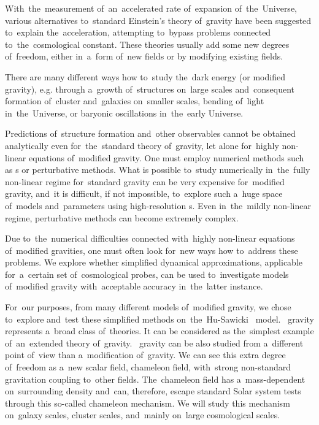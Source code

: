 With~the~measurement of~an~accelerated rate of~expansion of~the~Universe, various alternatives to~standard Einstein's theory of~gravity have been suggested to~explain the~acceleration, attempting to~bypass problems connected to~the~cosmological constant. These theories usually add some new degrees of~freedom, either in~a~form of~new fields or by modifying existing fields.

There are many different ways how to~study the~dark energy (or modified gravity), e.g. through a~growth of~structures on~large scales and~consequent formation of~cluster and~galaxies on~smaller scales, bending of~light in~the~Universe, or baryonic oscillations in~the~early Universe.

Predictions of~structure formation and~other observables cannot be obtained analytically even for~the~standard theory of~gravity, let alone for~highly non-linear equations of~modified gravity. One must employ numerical methods such as \nbodysim s or perturbative methods. What is possible to~study numerically in~the~fully non-linear regime for~standard gravity can be very expensive for~modified gravity, and~it is difficult, if not impossible, to~explore such a~huge space of~models and~parameters using high-resolution \nbodysim s. Even in~the~mildly non-linear regime, perturbative methods can become extremely complex.

Due to~the~numerical difficulties connected with~highly non-linear equations of~modified gravities, one must often look for~new ways how to~address these problems. We explore whether simplified dynamical approximations, applicable for~a~certain set of~cosmological probes, can be used to~investigate models of~modified gravity with~acceptable accuracy in~the~latter instance.

For~our purposes, from many different models of~modified gravity, we chose to~explore and~test these simplified methods on~the~Hu-Sawicki \fR\ model. \fR\ gravity represents a~broad class of~theories. It can be considered as the~simplest example of~an~extended theory of~gravity. \fR\ gravity can be also studied from a~different point of~view than a~modification of~gravity. We can see this extra degree of~freedom as a~new scalar field, chameleon field, with~strong non-standard gravitation coupling to~other fields. The~chameleon field has a~mass-dependent on~surrounding density and~can, therefore, escape standard Solar system tests through this so-called chameleon mechanism. We will study this mechanism on~galaxy scales, cluster scales, and~mainly on~large cosmological scales.

